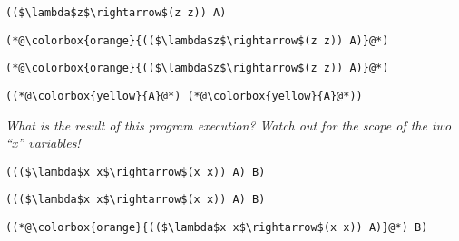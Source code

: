 \documentclass{beamer}
\begin{document}
\begin{frame}[fragile]{\CurrentSection}
\lstset{basicstyle=\ttfamily\small}\lstset{numbers=none}\lstset{language=ML}\begin{lstlisting}
(($\lambda$z$\rightarrow$(z z)) A)
\end{lstlisting}
\pause\lstset{language=ML}\begin{lstlisting}
(*@\colorbox{orange}{(($\lambda$z$\rightarrow$(z z)) A)}@*)
\end{lstlisting}

\end{frame}

\begin{frame}[fragile]{\CurrentSection}
\lstset{basicstyle=\ttfamily\small}\lstset{numbers=none}\lstset{language=ML}\begin{lstlisting}
(*@\colorbox{orange}{(($\lambda$z$\rightarrow$(z z)) A)}@*)
\end{lstlisting}
\pause\lstset{language=ML}\begin{lstlisting}
((*@\colorbox{yellow}{A}@*) (*@\colorbox{yellow}{A}@*))
\end{lstlisting}

\end{frame}

\begin{frame}[fragile]{\CurrentSection}
\begin{exampleblock}{}
\textit{What is the result of this program execution? Watch out for the scope of the two ``x'' variables!}
\end{exampleblock}

 
\lstset{basicstyle=\ttfamily\small}\lstset{numbers=none}\lstset{language=ML}\begin{lstlisting}
((($\lambda$x x$\rightarrow$(x x)) A) B)
\end{lstlisting}
 

\end{frame}

\begin{frame}[fragile]{\CurrentSection}
\lstset{basicstyle=\ttfamily\small}\lstset{numbers=none}\lstset{language=ML}\begin{lstlisting}
((($\lambda$x x$\rightarrow$(x x)) A) B)
\end{lstlisting}
\pause\lstset{language=ML}\begin{lstlisting}
((*@\colorbox{orange}{(($\lambda$x x$\rightarrow$(x x)) A)}@*) B)
\end{lstlisting}

\end{frame}
\end{document}
